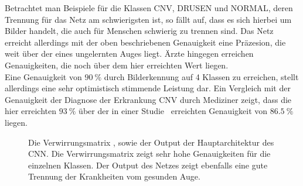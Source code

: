 %
Betrachtet man Beispiele für die Klassen CNV, DRUSEN und NORMAL, deren
Trennung für das Netz am schwierigsten ist, so fällt auf, dass es sich hierbei
um Bilder handelt, die auch für Menschen schwierig zu trennen sind. Das Netz
erreicht allerdings mit der oben beschriebenen Genauigkeit eine Präzesion, die
weit über der eines ungelernten Auges liegt. Ärzte hingegen erreichen
Genauigkeiten, die noch über dem hier erreichten Wert liegen.\\
Eine Genauigkeit von $\SI{90}{\percent}$ durch Bilderkennung auf 4 Klassen zu
erreichen, stellt allerdings eine sehr optimistisch stimmende Leistung dar.
Ein Vergleich mit der Genauigkeit der Diagnose der Erkrankung CNV durch
Mediziner zeigt, dass die hier erreichten $\SI{93}{\percent}$ über der in einer
Studie~\cite{CNV} erreichten Genauigkeit von $\SI{86.5}{\percent}$ liegen.
\newpage
%
\begin{figure}[h!]
  \caption{Die Verwirrungsmatrix \protect{}, sowie der Output \protect{} der Hauptarchitektur des CNN. Die Verwirrungsmatrix zeigt sehr hohe Genauigkeiten für die einzelnen Klassen. Der Output des Netzes zeigt ebenfalls eine gute Trennung der Krankheiten vom gesunden Auge.}
  \label{fig:erg}
\end{figure}
